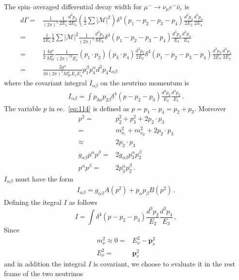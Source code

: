 The spin--averaged differential decay width for $\mu^-\to\nu_\mu e^-\bar{\nu}_e$ is
\begin{align}
  \label{eq:113}
  d\Gamma =& \frac{1}{(2\pi)^5}\frac{1}{2E_1}\frac{d^3 p_3}{2E_3}
\left(\frac{1}{2}\sum\left|\mathcal{M}\right|^2\right) \delta^4(p_1-p_2-p_3-p_4)
\frac{d^3 p_2}{2E_2}\frac{d^3 p_4}{2E_4}\nonumber\\
 =&\frac{1}{2E_1}\frac{1}{2}\sum\left|\mathcal{M}\right|^2\frac{1}{(2\pi)^5}\frac{d^3 p_2}{8E_2}
  \delta^4(p_1-p_2-p_3-p_4)\frac{d^3 p_3}{E_3}\frac{d^3 p_4}{E_4}\nonumber\\
=&\frac{1}{2}\frac{4g^4}{M_W^4}\frac{1}{(2\pi)^52E_1}(p_1\cdot p_2)(p_3\cdot p_4)\frac{d^3 p_2}{2E_2}
  \delta^4(p_1-p_2-p_3-p_4)\frac{d^3 p_3}{2E_3}\frac{d^3 p_4}{2E_4}\nonumber\\
  =&\frac{2g^4}{16 (2\pi)^5 M_W^4 E_1 E_4}p_1^\beta p_4^\alpha d^3p_4 I_{\alpha\beta}
\end{align}
where the covariant integral $I_{\alpha\beta}$ on the neutrino momentum is
\begin{align}
  \label{eq:114}
  I_{\alpha\beta}=\int p_{3\alpha}p_{2\beta}\delta^4(p-p_2-p_3)\frac{d^3 p_2}{E_2}\frac{d^3 p_3}{E_3}\,.
\end{align}
The variable $p$ in ec.~\eqref{eq:114} is defined as $p=p_1-p_4=p_2+p_3$. Moreover
\begin{align}
  \label{eq:115}
  p^2=&p_2^2+p_3^2+2p_2\cdot p_3\nonumber\\
  =&m_{\nu_e}^2+m_{\nu_\mu}^2+2p_2\cdot p_3\nonumber\\
  \approx&2p_2\cdot p_3\nonumber\\
g_{\alpha\beta}p^\alpha p^\beta=&2 g_{\alpha\beta}p_3^\alpha p_2^\beta\nonumber\\
p^\alpha p^\beta=&2p_3^\alpha p_2^\beta\,.
\end{align}
$I_{\alpha\beta}$ must have the form
\begin{align}
  \label{eq:116}
  I_{\alpha\beta}=g_{\alpha\beta}A(p^2)+p_\alpha p_\beta B(p^2)\,.
\end{align}
Defining the itegral $I$ as follows
\begin{equation}
  I=\int\delta^4(p-p_2-p_3)\frac{d^3 p_2}{E_2}\frac{d^3 p_3}{E_3}\,,
\end{equation}
Since
\begin{align}
  m_\nu^2\approx0=&E_\nu^2-\mathbf{p}_\nu^2\nonumber\\
E_\nu^2=&\mathbf{p}_\nu^2
\end{align}
and in addition the integral $I$ is covariant, we choose to evaluate it in the rest frame of the two neutrinos
